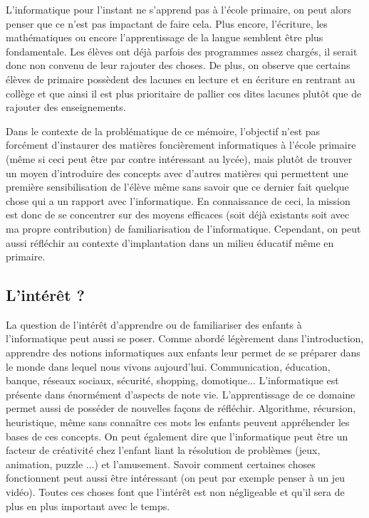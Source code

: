 L'informatique pour l'instant ne s'apprend pas à l'école primaire, on peut alors penser que ce n'est pas impactant de faire cela. Plus encore, l'écriture, les mathématiques ou encore l'apprentissage de la langue semblent être plus fondamentale. Les élèves ont déjà parfois des programmes assez chargés, il serait donc non convenu de leur rajouter des choses. De plus, on observe que certains élèves de primaire possèdent des lacunes en lecture et en écriture en rentrant au collège et que ainsi il est plus prioritaire de pallier ces dites lacunes plutôt que de rajouter des enseignements. \cite{4} \cite{5}

Dans le contexte de la problématique de ce mémoire, l'objectif n'est pas forcément d'instaurer des matières foncièrement informatiques à l'école primaire (même si ceci peut être par contre intéressant au lycée), mais plutôt de trouver un moyen d'introduire des concepts avec d'autres matières qui permettent une première sensibilisation de l'élève même sans savoir que ce dernier fait quelque chose qui a un rapport avec l'informatique. En connaissance de ceci, la mission est donc de se concentrer sur des moyens efficaces (soit déjà existants soit avec ma propre contribution) de familiarisation de l'informatique. Cependant, on peut aussi réfléchir au contexte d'implantation dans un milieu éducatif même en primaire.

\subsection{L'intérêt ?}

La question de l'intérêt d'apprendre ou de familiariser des enfants à l'informatique peut aussi se poser. Comme abordé légèrement dans l'introduction, apprendre des notions informatiques aux enfants leur permet de se préparer dans le monde dans lequel nous vivons aujourd'hui. Communication, éducation, banque, réseaux sociaux, sécurité, shopping, domotique... L'informatique est présente dans énormément d'aspects de note vie. 
L'apprentissage de ce domaine permet aussi de posséder de nouvelles façons de réfléchir. Algorithme, récursion, heuristique, même sans connaître ces mots les enfants peuvent appréhender les bases de ces concepts. On peut également dire que l'informatique peut être un facteur de créativité chez l'enfant liant la résolution de problèmes (jeux, animation, puzzle ...) et l'amusement. Savoir comment certaines choses fonctionnent peut aussi être intéressant (on peut par exemple penser à un jeu vidéo). Toutes ces choses font que l'intérêt est non négligeable et qu'il sera de plus en plus important avec le temps. \cite{9}

